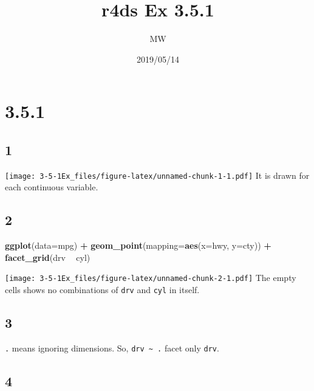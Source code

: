 \documentclass[]{article}
\title{r4ds Ex 3.5.1}
\author{MW}
\date{2019/05/14}
\newenvironment{Shaded}{\begin{snugshade}}{\end{snugshade}}
\newcommand{\DataTypeTok}[1]{\textcolor[rgb]{0.13,0.29,0.53}{#1}}
\newcommand{\KeywordTok}[1]{\textcolor[rgb]{0.13,0.29,0.53}{\textbf{#1}}}
\newcommand{\NormalTok}[1]{#1}
\newcommand{\OperatorTok}[1]{\textcolor[rgb]{0.81,0.36,0.00}{\textbf{#1}}}
\newcommand{\StringTok}[1]{\textcolor[rgb]{0.31,0.60,0.02}{#1}}
\begin{document}
\maketitle

\hypertarget{section}{%
\section{3.5.1}\label{section}}

\hypertarget{section-1}{%
\subsection{1}\label{section-1}}

\texttt{[image: 3-5-1Ex\_files/figure-latex/unnamed-chunk-1-1.pdf]} It is
drawn for each continuous variable.

\hypertarget{section-2}{%
\subsection{2}\label{section-2}}

\begin{Shaded}
\begin{Highlighting}[]
\KeywordTok{ggplot}\NormalTok{(}\DataTypeTok{data=}\NormalTok{mpg) }\OperatorTok{+}
\StringTok{    }\KeywordTok{geom_point}\NormalTok{(}\DataTypeTok{mapping=}\KeywordTok{aes}\NormalTok{(}\DataTypeTok{x=}\NormalTok{hwy, }\DataTypeTok{y=}\NormalTok{cty)) }\OperatorTok{+}
\StringTok{    }\KeywordTok{facet_grid}\NormalTok{(drv }\OperatorTok{~}\StringTok{ }\NormalTok{cyl)}
\end{Highlighting}
\end{Shaded}

\texttt{[image: 3-5-1Ex\_files/figure-latex/unnamed-chunk-2-1.pdf]} The
empty cells shows no combinations of \texttt{drv} and \texttt{cyl} in
itself.

\hypertarget{section-3}{%
\subsection{3}\label{section-3}}

\texttt{.} means ignoring dimensions. So,
\texttt{drv\ \textasciitilde{}\ .} facet only \texttt{drv}.

\hypertarget{section-4}{%
\subsection{4}\label{section-4}}
\end{document}
